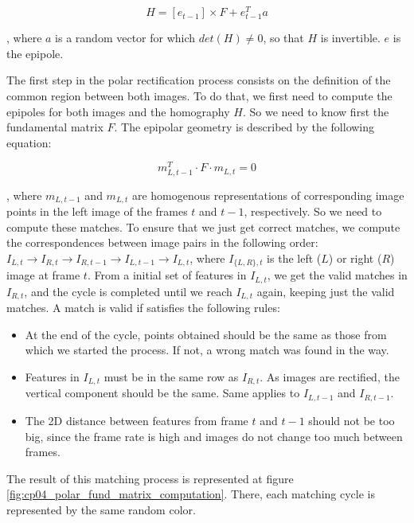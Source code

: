 \begin{equation}\label{eq:cp04_homography}
H = [e_{t - 1}] \times F + e_{t - 1}^T a
\end{equation}

, where $a$ is a random vector for which $det(H) \neq 0$, so that $H$ is invertible. $e$ is the epipole.

The first step in the polar rectification process consists on the definition of the common region between both images. To do that, we first need to compute the epipoles for both images and the homography $H$. So we need to know first the fundamental matrix $F$. The epipolar geometry is described by the following equation:

\begin{equation}\label{eq:cp04_fundamental_matrix}
m_{L,t - 1}^T \cdot F \cdot m_{L,t}= 0
\end{equation}

, where $m_{L,t - 1}$ and $m_{L,t}$ are homogenous representations of corresponding image points in the left image of the frames $t$ and $t - 1$, respectively. So we need to compute these matches. To ensure that we just get correct matches, we compute the correspondences between image pairs in the following order: $I_{L, t} \rightarrow I_{R, t} \rightarrow I_{R, t - 1} \rightarrow I_{L, t - 1} \rightarrow I_{L, t}$, where $I_{\{L,R\},t}$ is the left ($L$) or right ($R$) image at frame $t$. From a initial set of features in $I_{L, t}$, we get the valid matches in $I_{R, t}$, and the cycle is completed until we reach $I_{L, t}$ again, keeping just the valid matches. A match is valid if satisfies the following rules:
\begin{itemize}
 \item At the end of the cycle, points obtained should be the same as those from which we started the process. If not, a wrong match was found in the way.
 \item Features in $I_{L, t}$ must be in the same row as $I_{R, t}$. As images are rectified, the vertical component should be the same. Same applies to $I_{L, t - 1}$ and $I_{R, t - 1}$.
 \item The 2D distance between features from frame $t$ and $t - 1$ should not be too big, since the frame rate is high and images do not change too much between frames.
\end{itemize}

The result of this matching process is represented at figure \ref{fig:cp04_polar_fund_matrix_computation}. There, each matching cycle is represented by the same random color.

